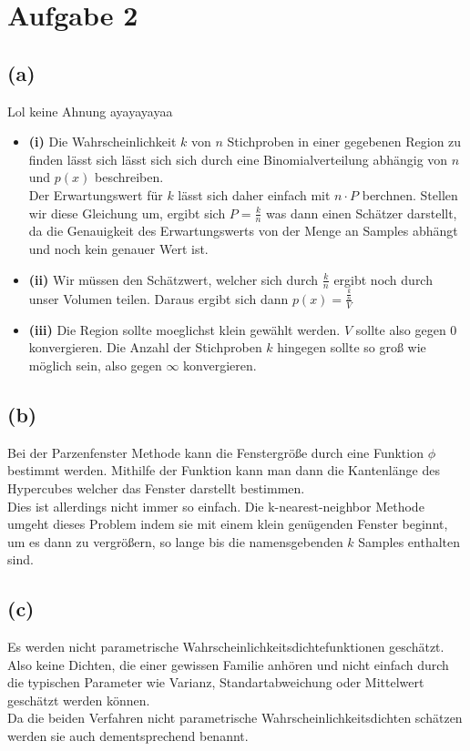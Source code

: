 \documentclass[a4paper]{scrartcl}
\begin{document}
\section*{Aufgabe 2}
\subsection*{(a)}
Lol keine Ahnung ayayayayaa
\begin{itemize}
	\item \textbf{(i)} Die Wahrscheinlichkeit $k$ von $n$ Stichproben in einer gegebenen Region zu finden lässt sich lässt sich sich durch eine Binomialverteilung abhängig von $n$ und $p(x)$ beschreiben.\\
	Der Erwartungswert für $k$ lässt sich daher einfach mit $n \cdot P$ berchnen. Stellen wir diese Gleichung um, ergibt sich $P = \frac{k}{n}$ was dann einen Schätzer darstellt, da die Genauigkeit des Erwartungswerts von der Menge an Samples abhängt und noch kein genauer Wert ist.
	
	\item \textbf{(ii)} Wir müssen den Schätzwert, welcher sich durch $\frac{k}{n}$ ergibt noch durch unser Volumen teilen. Daraus ergibt sich dann $p(x)=\frac{\frac{k}{n}}{V}$
	
	
	\item  \textbf{(iii)} Die Region sollte moeglichst klein gewählt werden. $V$ sollte also gegen $0$ konvergieren. Die Anzahl der Stichproben $k$ hingegen sollte so groß wie möglich sein, also gegen $\infty$ konvergieren.
	
\end{itemize}




\subsection*{(b)}
Bei der Parzenfenster Methode kann die Fenstergröße durch eine Funktion $\phi$ bestimmt werden. Mithilfe der Funktion kann man dann die Kantenlänge des Hypercubes welcher das Fenster darstellt bestimmen.\\
Dies ist allerdings nicht immer so einfach. Die k-nearest-neighbor Methode umgeht dieses Problem indem sie mit einem klein genügenden Fenster beginnt, um es dann zu vergrößern, so lange bis die namensgebenden $k$ Samples enthalten sind.


\subsection*{(c)}
Es werden nicht parametrische Wahrscheinlichkeitsdichtefunktionen geschätzt. Also keine Dichten, die einer gewissen Familie anhören und nicht einfach durch die typischen Parameter wie Varianz, Standartabweichung oder Mittelwert geschätzt werden können.\\
Da die beiden Verfahren nicht parametrische Wahrscheinlichkeitsdichten schätzen werden sie auch dementsprechend benannt.
\end{document}
